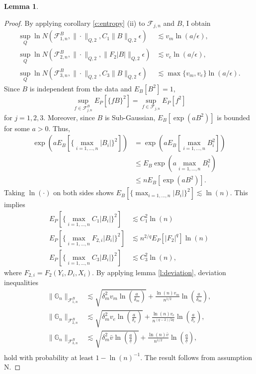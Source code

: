 \documentclass[12pt,oneside,reqno,english]{amsart}
\theoremstyle{definition}
\newtheorem{lemma}{Lemma}
\begin{document}
\begin{lemma}
\begin{proof}
By applying corollary \ref{c:entropy} (ii) to $\mathcal{F}_{j,n}$ and $B$, I obtain
\begin{align*}
\sup_{Q}\ln N(\mathcal{F}_{1,n}^{B},\|\cdot\|_{Q,2},C_{1}\|B\|_{Q,2}\epsilon)&\lesssim  v_{m}\ln(a/\epsilon),\\
\sup_{Q}\ln N(\mathcal{F}_{2,n}^{B},\|\cdot \|_{Q,2},\|F_{2}|B|\|_{Q,2}\epsilon)&\lesssim v_{e}\ln(a/\epsilon),\\
\sup_{Q}\ln N(\mathcal{F}_{3,n}^{B},\|\cdot\|_{Q,2},C_{3}\|B\|_{Q,2}\epsilon )&\lesssim \max\{v_{m},v_{e}\}\ln(a/\epsilon).
\end{align*}
Since $B$ is independent from the data and $E_{B}[B^{2}]=1$, 
\[\sup_{f\in\mathcal{F}_{j,n}^{B}}E_{P}[\{fB\}^{2}]=\sup_{f\in\mathcal{F}_{j,n}}E_{P}[f^{2}]\]
for $j=1,2,3$.
Moreover, since $B$ is Sub-Gaussian, $E_{B}[\exp(aB^{2})]$ is bounded for some $a>0$. Thus, 
\begin{align*}
\exp(aE_{B}[\{\max_{i=1,\ldots,n}|B_{i}|\}^{2}])
&=\exp(aE_{B}[\max_{i=1,\ldots,n}B_{i}^{2}])\\
&\leq E_{B}\exp(a\max_{i=1,\ldots,n}B_{i}^{2})\\
&\leq nE_{B}[\exp(aB^{2})]. 
\end{align*}
Taking $\ln(\cdot)$ on both sides shows 
 $E_{B}[\{\max_{i=1,...,n}|B_{i}|\}^{2}]\lesssim \ln(n)$. This implies   
\begin{align*}
E_{P}[\{\max_{i=1,...,n}C_{1}|B_{i}|\}^{2}]&\lesssim C_{1}^{2}\ln(n)\\
E_{P}[\{\max_{i=1,...,n}F_{2,i}|B_{i}|\}^{2}]&\lesssim n^{2/q}E_{P}[|F_{2}|^{q}]\ln(n)\\
E_{P}[\{\max_{i=1,...,n}C_{3}|B_{i}|\}^{2}]&\lesssim C_{3}^{2}\ln(n),
\end{align*}
where $F_{2,i}=F_{2}(Y_{i},D_{i},X_{i})$. 
By applying lemma \ref{l:deviation}, deviation inequalities 
\begin{align*}
\|\mathbb{G}_{n}\|_{\mathcal{F}_{1,n}^{B}}&\lesssim 
\sqrt{ \delta_{m}^{2} v_{m}\ln\left(\frac{a}{ \delta_{m}}\right)}+\frac{\ln(n)v_{m}}{n^{1/2}}\ln\left(\frac{a}{ \delta_{m}}\right),\\
\|\mathbb{G}_{n}\|_{\mathcal{F}_{2,n}^{B}}&\lesssim  \sqrt{ \delta_{m}^{2} v_{e}\ln\left(\frac{a}{ \delta_{e}}\right)}+\frac{\ln(n)v_{e}}{n^{(q-2)/2q}}\ln\left(\frac{a}{ \delta_{e}}\right),\\ 
\|\mathbb{G}_{n}\|_{\mathcal{F}_{3,n}^{B}}&\lesssim 
\sqrt{ \delta_{m}^{2} \bar{v}\ln\left(\frac{a}{\underline{\delta}}\right)}+\frac{\ln(n)\bar{v}}{n^{1/2}}\ln\left(\frac{a}{ \underline{\delta}}\right),\\
\end{align*}
hold with probability at least $1-\ln(n)^{-1}$. The result follows from assumption N.  
\end{proof}
\end{lemma}
\end{document}

